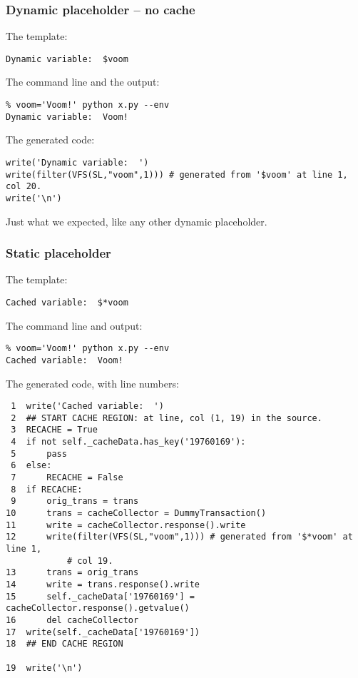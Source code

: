 \subsubsection{Dynamic placeholder -- no cache}
\label{output.cache.dynamic}

The template:
\begin{verbatim}
Dynamic variable:  $voom
\end{verbatim}

The command line and the output:
\begin{verbatim}
% voom='Voom!' python x.py --env
Dynamic variable:  Voom!
\end{verbatim}

The generated code:
\begin{verbatim}
write('Dynamic variable:  ')
write(filter(VFS(SL,"voom",1))) # generated from '$voom' at line 1, col 20.
write('\n')
\end{verbatim}

Just what we expected, like any other dynamic placeholder.

\subsubsection{Static placeholder}
\label{output.cache.static}

The template:
\begin{verbatim}
Cached variable:  $*voom
\end{verbatim}

The command line and output:
\begin{verbatim}
% voom='Voom!' python x.py --env
Cached variable:  Voom!
\end{verbatim}

The generated code, with line numbers:
\begin{verbatim}
 1  write('Cached variable:  ')
 2  ## START CACHE REGION: at line, col (1, 19) in the source.
 3  RECACHE = True
 4  if not self._cacheData.has_key('19760169'):
 5      pass
 6  else:
 7      RECACHE = False
 8  if RECACHE:
 9      orig_trans = trans
10      trans = cacheCollector = DummyTransaction()
11      write = cacheCollector.response().write
12      write(filter(VFS(SL,"voom",1))) # generated from '$*voom' at line 1,
            # col 19.
13      trans = orig_trans
14      write = trans.response().write
15      self._cacheData['19760169'] = cacheCollector.response().getvalue()
16      del cacheCollector
17  write(self._cacheData['19760169'])
18  ## END CACHE REGION
    
19  write('\n')
\end{verbatim}


